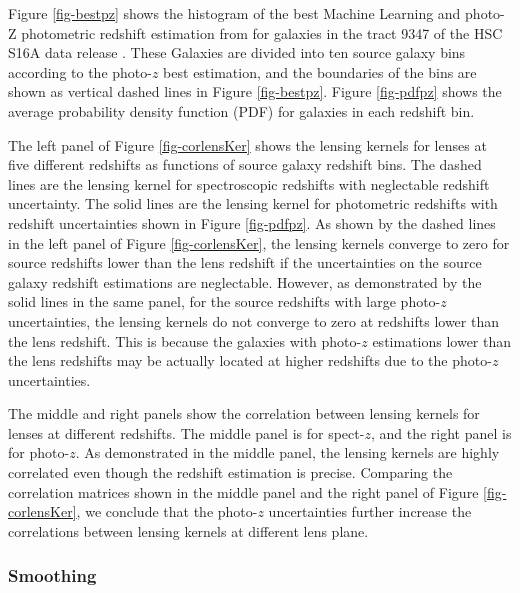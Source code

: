 \documentclass[twocolumn]{aastex62}
\begin{document}
Figure \ref{fig-bestpz} shows the histogram of the best Machine Learning and
photo-Z \citep[MLZ]{MLZ-TPZ2013} photometric redshift estimation from
\cite{HSC1-photoz} for galaxies in the tract 9347 of the HSC S16A data release
\citep{HSC1-data}. These Galaxies are divided into ten source galaxy bins
according to the photo-$z$ best estimation, and the boundaries of the bins are
shown as vertical dashed lines in Figure \ref{fig-bestpz}. Figure \ref{fig-pdfpz}
shows the average probability density function (PDF) for galaxies in each
redshift bin.

The left panel of Figure \ref{fig-corlensKer} shows the lensing kernels for
lenses at five different redshifts as functions of source galaxy redshift bins.
The dashed lines are the lensing kernel for spectroscopic redshifts with
neglectable redshift uncertainty. The solid lines are the lensing kernel for
photometric redshifts with redshift uncertainties shown in Figure
\ref{fig-pdfpz}.  As shown by the dashed lines in the left panel of Figure
\ref{fig-corlensKer}, the lensing kernels converge to zero for source redshifts
lower than the lens redshift if the uncertainties on the source galaxy
redshift estimations are neglectable. However, as demonstrated by the solid
lines in the same panel, for the source redshifts with large photo-$z$
uncertainties, the lensing kernels do not converge to zero at redshifts lower
than the lens redshift. This is because the galaxies with photo-$z$ estimations
lower than the lens redshifts may be actually located at higher redshifts due
to the photo-$z$ uncertainties.

The middle and right panels show the correlation between lensing kernels for
lenses at different redshifts. The middle panel is for spect-$z$, and the right
panel is for photo-$z$.  As demonstrated in the middle panel, the lensing
kernels are highly correlated even though the redshift estimation is precise.
Comparing the correlation matrices shown in the middle panel and the right
panel of Figure \ref{fig-corlensKer}, we conclude that the photo-$z$
uncertainties further increase the correlations between lensing kernels at
different lens plane.

\subsubsection{Smoothing}
\label{subsec:method-smoothing}
\end{document}
